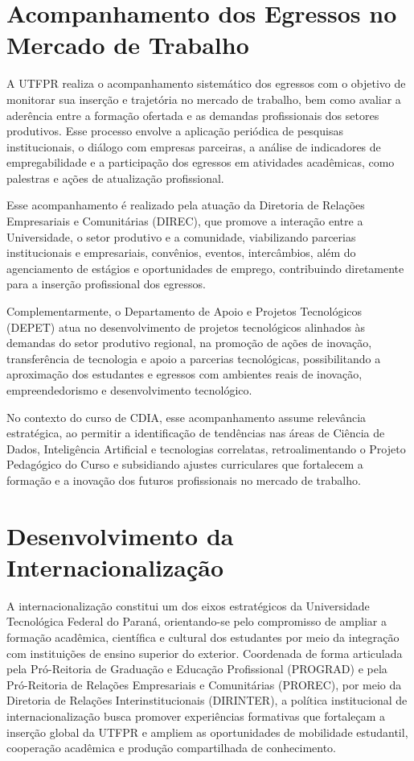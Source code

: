 \section{Acompanhamento dos Egressos no Mercado de Trabalho}

A UTFPR realiza o acompanhamento sistemático dos egressos com o objetivo de monitorar sua inserção e trajetória no mercado de trabalho, bem como avaliar a aderência entre a formação ofertada e as demandas profissionais dos setores produtivos. Esse processo envolve a aplicação periódica de pesquisas institucionais, o diálogo com empresas parceiras, a análise de indicadores de empregabilidade e a participação dos egressos em atividades acadêmicas, como palestras e ações de atualização profissional.

Esse acompanhamento é realizado pela atuação da Diretoria de Relações Empresariais e Comunitárias (DIREC), que promove a interação entre a Universidade, o setor produtivo e a comunidade, viabilizando parcerias institucionais e empresariais, convênios, eventos, intercâmbios, além do agenciamento de estágios e oportunidades de emprego, contribuindo diretamente para a inserção profissional dos egressos.

Complementarmente, o Departamento de Apoio e Projetos Tecnológicos (DEPET) atua no desenvolvimento de projetos tecnológicos alinhados às demandas do setor produtivo regional, na promoção de ações de inovação, transferência de tecnologia e apoio a parcerias tecnológicas, possibilitando a aproximação dos estudantes e egressos com ambientes reais de inovação, empreendedorismo e desenvolvimento tecnológico.

No contexto do curso de CDIA, esse acompanhamento assume relevância estratégica, ao permitir a identificação de tendências nas áreas de Ciência de Dados, Inteligência Artificial e tecnologias correlatas, retroalimentando o Projeto Pedagógico do Curso e subsidiando ajustes curriculares que fortalecem a formação e a inovação dos futuros profissionais no mercado de trabalho.

\section{Desenvolvimento da Internacionalização}

A internacionalização constitui um dos eixos estratégicos da Universidade Tecnológica Federal do Paraná, orientando-se pelo compromisso de ampliar a formação acadêmica, científica e cultural dos estudantes por meio da integração com instituições de ensino superior do exterior. Coordenada de forma articulada pela Pró-Reitoria de Graduação e Educação Profissional (PROGRAD) e pela Pró-Reitoria de Relações Empresariais e Comunitárias (PROREC), por meio da Diretoria de Relações Interinstitucionais (DIRINTER), a política institucional de internacionalização busca promover experiências formativas que fortaleçam a inserção global da UTFPR e ampliem as oportunidades de mobilidade estudantil, cooperação acadêmica e produção compartilhada de conhecimento.

